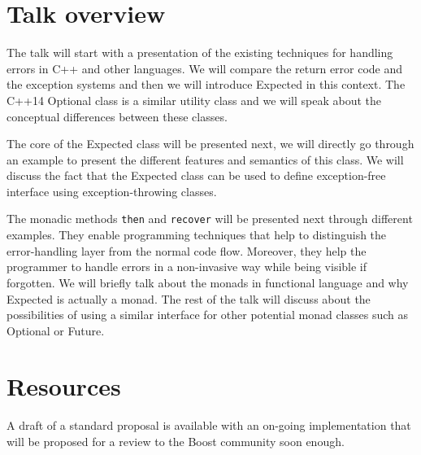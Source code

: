 \documentclass[a4paper,10pt]{article}
\begin{document}
\section{Talk overview}

The talk will start with a presentation of the existing techniques for handling errors in C++ and other languages. We will compare the return error code and the exception systems and then we will introduce Expected in this context. The C++14 Optional class is a similar utility class and we will speak about the conceptual differences between these classes.
\newline

The core of the Expected class will be presented next, we will directly go through an example to present the different features and semantics of this class. We will discuss the fact that the Expected class can be used to define exception-free interface using exception-throwing classes.
\newline

The monadic methods \lstinline{then} and \lstinline{recover} will be presented next through different examples. They enable programming techniques that help to distinguish the error-handling layer from the normal code flow. Moreover, they help the programmer to handle errors in a non-invasive way while being visible if forgotten. We will briefly talk about the monads in functional language and why Expected is actually a monad. The rest of the talk will discuss about the possibilities of using a similar interface for other potential monad classes such as Optional or Future.

\section{Resources}

A draft of a standard proposal is available\cite{std.expected} with an on-going implementation\cite{boost.expected} that will be proposed for a review to the Boost community soon enough.

\newpage


\end{document}
